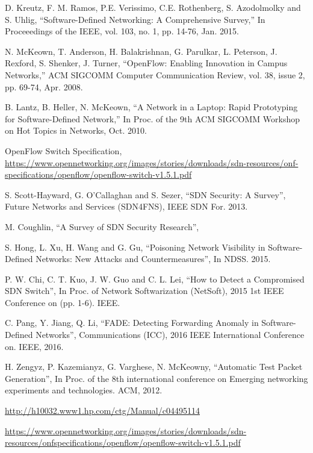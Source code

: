 \begin{thebibliography}{1}

D. Kreutz, F. M. Ramos, P.E. Verissimo, C.E. Rothenberg, S. Azodolmolky and S. Uhlig,
``Software-Defined Networking: A Comprehensive Survey,'' In Proceeedings of the IEEE, vol. 103, no. 1, pp.  14-76, Jan. 2015.

N. McKeown, T. Anderson, H. Balakrishnan, G. Parulkar, L. Peterson, J. Rexford, S. Shenker, J. Turner,
``OpenFlow: Enabling Innovation in Campus Networks,'' ACM SIGCOMM Computer Communication Review, vol. 38, issue 2, pp. 69-74, Apr. 2008.

B. Lantz, B. Heller, N. McKeown,
``A Network in a Laptop: Rapid Prototyping for Software-Defined Network,'' In Proc. of the 9th ACM SIGCOMM Workshop on Hot Topics in Networks, Oct. 2010.

OpenFlow Switch Specification, \url{https://www.opennetworking.org/images/stories/downloads/sdn-resources/onf-specifications/openflow/openflow-switch-v1.5.1.pdf}

S. Scott-Hayward, G. O’Callaghan and S. Sezer,
``SDN Security: A Survey'', Future Networks and Services (SDN4FNS), IEEE SDN For. 2013.

M. Coughlin,
``A Survey of SDN Security Research'',

S. Hong, L. Xu, H. Wang and G. Gu,
``Poisoning Network Visibility in Software-Defined Networks: New Attacks and Countermeasures'', In NDSS. 2015.

P. W. Chi, C. T. Kuo, J. W. Guo and C. L. Lei,
``How to Detect a Compromised SDN Switch'', In Proc. of Network Softwarization (NetSoft), 2015 1st IEEE Conference on (pp. 1-6). IEEE.

C. Pang, Y. Jiang, Q. Li,
``FADE: Detecting Forwarding Anomaly in Software-Defined Networks'', Communications (ICC), 2016 IEEE International Conference on. IEEE, 2016.

H. Zengyz, P. Kazemianyz, G. Varghese, N. McKeowny,
``Automatic Test Packet Generation'', In Proc. of the 8th international conference on Emerging networking experiments and technologies. ACM, 2012.

\url{http://h10032.www1.hp.com/ctg/Manual/c04495114}

\url{https://www.opennetworking.org/images/stories/downloads/sdn-resources/onfspecifications/openflow/openflow-switch-v1.5.1.pdf}


\end{thebibliography}
